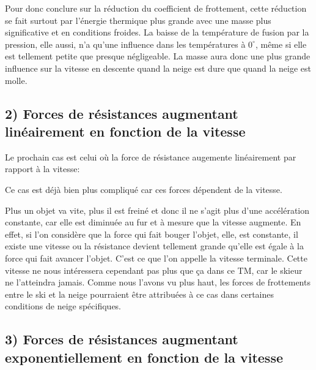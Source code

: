 \documentclass{article}
\begin{document}
\vspace{0.2cm}

Pour donc conclure sur la réduction du coefficient de frottement, cette réduction se fait surtout par l'énergie thermique plus grande avec une masse plus significative et en conditions froides. La baisse de la température de fusion par la pression, elle aussi, n'a qu'une influence dans les températures à $0^\circ$, même si elle est tellement petite que presque négligeable. La masse aura donc une plus grande influence sur la vitesse en descente quand la neige est dure que quand la neige est molle.


\subsection{2) Forces de résistances augmentant linéairement en fonction de la vitesse}

Le prochain cas est celui où la force de résistance augemente linéairement par rapport à la vitesse:

\begin{center}
\end{center}

Ce cas est déjà bien plus compliqué car ces forces dépendent de la vitesse.

Plus un objet va vite, plus il est freiné et donc il ne s'agit plus d'une accélération constante, car elle est diminuée au fur et à mesure que la vitesse augmente. En effet, si l'on considère que la force qui fait bouger l'objet, elle, est constante, il existe une vitesse ou la résistance devient tellement grande qu'elle est égale à la force qui fait avancer l'objet. C'est ce que l'on appelle la vitesse terminale. Cette vitesse ne nous intéressera cependant pas plus que ça dans ce TM, car le skieur ne l'atteindra jamais.
\newline Comme nous l'avons vu plus haut, les forces de frottements entre le ski et la neige pourraient être attribuées à ce cas dans certaines conditions de neige spécifiques.



\subsection{3) Forces de résistances augmentant exponentiellement en fonction de la vitesse}
\end{document}
